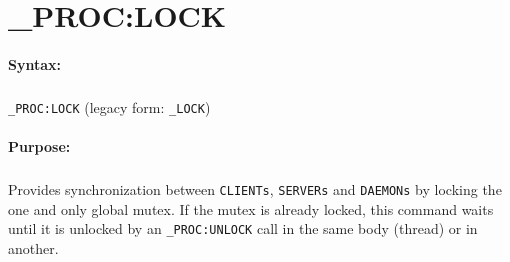 
\newpage
\section{\_PROC:LOCK}
\label{cmd:_PROC:LOCK}

\paragraph{Syntax:}
\subparagraph{}
\texttt{\_PROC:LOCK} (legacy form: \texttt{\_LOCK})

\paragraph{Purpose:}
\subparagraph{}
Provides synchronization between \texttt{CLIENTs}, \texttt{SERVERs}
and \texttt{DAEMONs} by locking the one and only global mutex.
If the mutex is already locked, this command waits until it is unlocked by an
\texttt{\_PROC:UNLOCK} call in the same body (thread) or in another.

